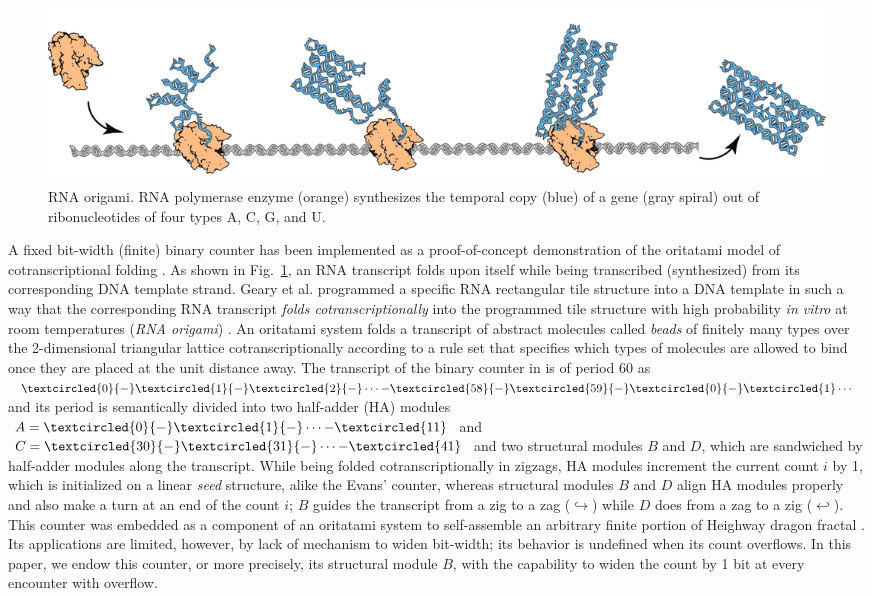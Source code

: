 \documentclass[twocolumn]{svjour3}
\begin{document}
\begin{figure}[tb]
\centering
\includegraphics[width=\linewidth]{fig/rna_origami.pdf}
\caption{RNA origami. RNA polymerase enzyme (orange) synthesizes the temporal copy (blue) of a gene (gray spiral) out of ribonucleotides of four types A, C, G, and U.}
\label{fig:rna_origami}
\end{figure}

A fixed bit-width (finite) binary counter has been implemented as a proof-of-concept demonstration of the oritatami model of cotranscriptional folding \cite{GeMeScSe2019}. 
As shown in Fig.~\ref{fig:rna_origami}, an RNA transcript folds upon itself while being transcribed (synthesized) from its corresponding DNA template strand. 
Geary et al. programmed a specific RNA rectangular tile structure into a DNA template in such a way that the corresponding RNA transcript \textit{folds cotranscriptionally} into the programmed tile structure with high probability \textit{in vitro} at room temperatures (\textit{RNA origami}) \cite{GearyRothemundAndersen2014}. 
An oritatami system folds a transcript of abstract molecules called \textit{beads} of finitely many types over the 2-dimensional triangular lattice cotranscriptionally according to a rule set that specifies which types of molecules are allowed to bind once they are placed at the unit distance away. 
The transcript of the binary counter in \cite{GeMeScSe2019} is of period 60 as $\textcircled{\scriptsize 0}{-}\textcircled{\scriptsize 1}{-}\textcircled{\scriptsize 2}{-} \cdots {-}\textcircled{\scriptsize 58}{-}\textcircled{\scriptsize 59}{-}\textcircled{\scriptsize 0}{-}\textcircled{\scriptsize 1} \cdots$ and its period is semantically divided into two half-adder (HA) modules $A = \textcircled{\scriptsize 0}{-}\textcircled{\scriptsize 1}{-} \cdots {-}\textcircled{\scriptsize 11}$ and $C = \textcircled{\scriptsize 30}{-}\textcircled{\scriptsize 31}{-} \cdots {-}\textcircled{\scriptsize 41}$ and two structural modules $B$ and $D$, which are sandwiched by half-adder modules along the transcript.
While being folded cotranscriptionally in zigzags, HA modules increment the current count $i$ by 1, which is initialized on a linear \textit{seed} structure, alike the Evans' counter, whereas structural modules $B$ and $D$ align HA modules properly and also make a turn at an end of the count $i$; $B$ guides the transcript from a zig to a zag ($\hookrightarrow$) while $D$ does from a zag to a zig ($\hookleftarrow$). 
This counter was embedded as a component of an oritatami system to self-assemble an arbitrary finite portion of Heighway dragon fractal \cite{MasudaSekiUbukata2018}. 
Its applications are limited, however, by lack of mechanism to widen bit-width; its behavior is undefined when its count overflows. 
In this paper, we endow this counter, or more precisely, its structural module $B$, with the capability to widen the count by 1 bit at every encounter with overflow. 
\end{document}
